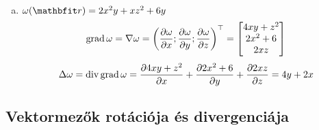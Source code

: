 \documentclass{szb-solution}
\begin{document}
\begin{enumerate}[a)]
  \item $\omega(\coordvec) = 2 x^2 y + x z^2 + 6 y$
        $$
          \operatorname{grad} \omega
          =
          \nabla \omega
          =
          \left(
          \pdv{\omega}{x}; \pdv{\omega}{y}; \pdv{\omega}{z}
          \right)^\top
          =
          \begin{bmatrix}
            4 x y + z^2 \\
            2 x^2 + 6   \\
            2 x z
          \end{bmatrix}
        $$
        $$
          \Delta \omega
          =
          \operatorname{div} \operatorname{grad} \omega
          =
          \pdv{4 x y + z^2}{x} + \pdv{2 x^2 + 6}{y} + \pdv{2 x z}{z}
          =
          4 y + 2 x
        $$
\end{enumerate}

\clearpage
\subsection{Vektormezők rotációja és divergenciája}
\end{document}
